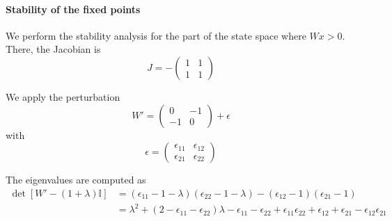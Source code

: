 \documentclass{article} %
\newcounter{ct}
\newcommand{\win}{\vW_{\text{in}}}
\newcommand{\wout}{\vW_{\text{out}}}
\newcommand{\bout}{\vb_{\text{out}}}
\theoremstyle{definition}
\theoremstyle{remark}
\begin{document}



%



\paragraph{Stability of the fixed points}
We perform the stability analysis for the part of the state space where \(Wx>0\).
There, the Jacobian is
\begin{equation}
J = -
\begin{pmatrix}
1  &  1 \\
1  &  1
\end{pmatrix}
\end{equation}

We apply the perturbation
\begin{equation}
W' =
\begin{pmatrix}
0  &  -1 \\
-1  &  0
\end{pmatrix}
+ \epsilon
\end{equation}
with
\begin{equation}
\epsilon =
\begin{pmatrix}
\epsilon_{11}  &  \epsilon_{12} \\
\epsilon_{21}  &  \epsilon_{22}
\end{pmatrix}
\end{equation}

The eigenvalues are computed as
\begin{align*}
\det [W' -(1+\lambda)\mathbb{I}] &= (\epsilon_{11}-1-\lambda)(\epsilon_{22}-1-\lambda)-(\epsilon_{12}-1)(\epsilon_{21}-1)\\
&=\lambda^2 + (2-\epsilon_{11}-\epsilon_{22})\lambda -\epsilon_{11}-\epsilon_{22}+\epsilon_{11}\epsilon_{22} +\epsilon_{12} + \epsilon_{21} - \epsilon_{12}\epsilon_{21}
\end{align*}
\end{document}
